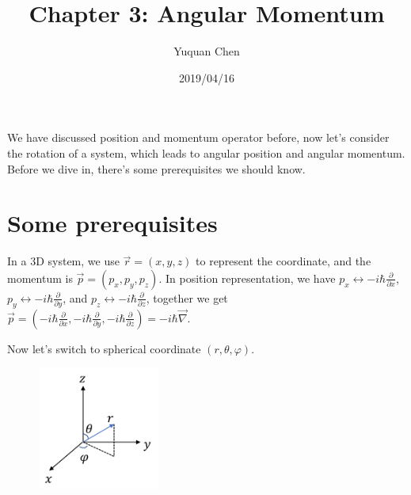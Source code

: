\documentclass[UTF8,12pt]{article} %
\begin{document}
\title{Chapter 3: Angular Momentum}
\author{Yuquan Chen}
\date{2019/04/16} %
\maketitle

We have discussed position and momentum operator before, now let's consider the rotation of a system, which leads to angular position and angular momentum. Before we dive in, there's some prerequisites we should know.

\section{Some prerequisites}

In a 3D system, we use $\vec{r} = (x,y,z)$ to represent the coordinate, and the momentum is $\vec{p} = (p_{x}, p_{y}, p_{z})$. In position representation, we have $p_{x} \leftrightarrow -i\hbar \frac{\partial}{\partial x}$, $p_{y} \leftrightarrow -i\hbar \frac{\partial}{\partial y}$, and $p_{z} \leftrightarrow -i\hbar \frac{\partial}{\partial z}$, together we get $\vec{p} = (-i\hbar \frac{\partial}{\partial x}, -i\hbar \frac{\partial}{\partial y}, -i\hbar \frac{\partial}{\partial z}) = -i\hbar \vec{\nabla}$.

Now let's switch to spherical coordinate $(r, \theta, \varphi)$.
\begin{figure}[H]
\begin{center}
\includegraphics[width=4cm]{sph}
\end{center}
\end{figure}
\end{document}
